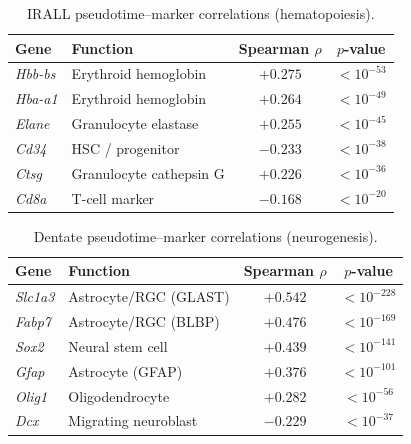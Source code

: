\documentclass[preprint,12pt,number]{elsarticle}
\begin{document}
\begin{table}[!t]
    \centering
    \caption{IRALL pseudotime--marker correlations (hematopoiesis).}
    \label{tab:irall_markers}
    \begin{tabular}{llcc}
        \toprule
        Gene & Function & Spearman $\rho$ & $p$-value \\
        \midrule
        \textit{Hbb-bs} & Erythroid hemoglobin     & $+0.275$ & $< 10^{-53}$ \\
        \textit{Hba-a1} & Erythroid hemoglobin     & $+0.264$ & $< 10^{-49}$ \\
        \textit{Elane}  & Granulocyte elastase     & $+0.255$ & $< 10^{-45}$ \\
        \textit{Cd34}   & HSC / progenitor         & $-0.233$ & $< 10^{-38}$ \\
        \textit{Ctsg}   & Granulocyte cathepsin G  & $+0.226$ & $< 10^{-36}$ \\
        \textit{Cd8a}   & T-cell marker            & $-0.168$ & $< 10^{-20}$ \\
        \bottomrule
    \end{tabular}
\end{table}

\begin{table}[!t]
    \centering
    \caption{Dentate pseudotime--marker correlations (neurogenesis).}
    \label{tab:dentate_markers}
    \begin{tabular}{llcc}
        \toprule
        Gene & Function & Spearman $\rho$ & $p$-value \\
        \midrule
        \textit{Slc1a3} & Astrocyte/RGC (GLAST)  & $+0.542$ & $< 10^{-228}$ \\
        \textit{Fabp7}  & Astrocyte/RGC (BLBP)   & $+0.476$ & $< 10^{-169}$ \\
        \textit{Sox2}   & Neural stem cell        & $+0.439$ & $< 10^{-141}$ \\
        \textit{Gfap}   & Astrocyte (GFAP)        & $+0.376$ & $< 10^{-101}$ \\
        \textit{Olig1}  & Oligodendrocyte         & $+0.282$ & $< 10^{-56}$  \\
        \textit{Dcx}    & Migrating neuroblast    & $-0.229$ & $< 10^{-37}$  \\
        \bottomrule
    \end{tabular}
\end{table}
\end{document}
